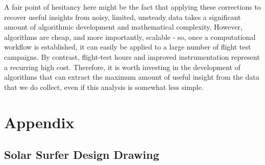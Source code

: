 A fair point of hesitancy here might be the fact that applying these corrections to recover useful insights from noisy, limited, unsteady data takes a significant amount of algorithmic development and mathematical complexity. However, algorithms are cheap, and more importantly, scalable - so, once a computational workflow is established, it can easily be applied to a large number of flight test campaigns. By contrast, flight-test hours and improved instrumentation represent a recurring high cost. Therefore, it is worth investing in the development of algorithms that can extract the maximum amount of useful insight from the data that we do collect, even if this analysis is somewhat less simple.



\clearpage


\section{Appendix}

\subsection{Solar Surfer Design Drawing}
\label{sec:solar_surfer_drawing}

\begin{figure}[H]
    \centering
    \label{fig:solar_surfer_design}
\end{figure}

